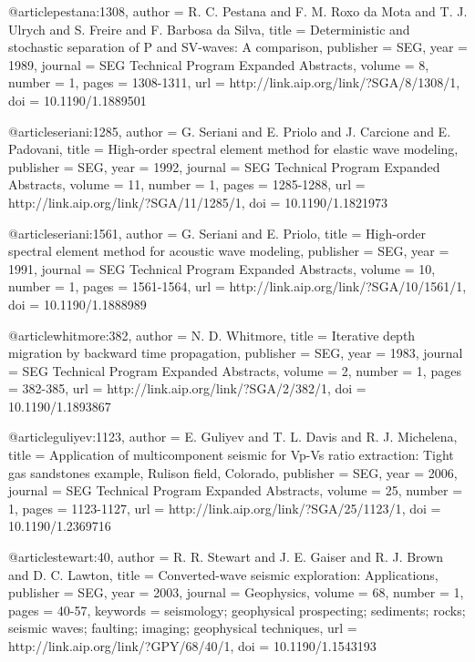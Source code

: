 {@article{pestana:1308,
  author =	 {R. C. Pestana and F. M. Roxo da Mota and
                  T. J. Ulrych and S. Freire and F. Barbosa
                  da Silva},
  title =	 {Deterministic and stochastic separation of {P} and
                  {SV}-waves: A comparison},
  publisher =	 {SEG},
  year =	 1989,
  journal =	 {SEG Technical Program Expanded Abstracts},
  volume =	 8,
  number =	 1,
  pages =	 {1308-1311},
  url =		 {http://link.aip.org/link/?SGA/8/1308/1},
  doi =		 {10.1190/1.1889501}
}

@article{seriani:1285,
  author =	 {G. Seriani and E. Priolo and J. Carcione and
                  E. Padovani},
  title =	 {High-order spectral element method for elastic wave
                  modeling},
  publisher =	 {SEG},
  year =	 1992,
  journal =	 {SEG Technical Program Expanded Abstracts},
  volume =	 11,
  number =	 1,
  pages =	 {1285-1288},
  url =		 {http://link.aip.org/link/?SGA/11/1285/1},
  doi =		 {10.1190/1.1821973}
}

@article{seriani:1561,
  author =	 {G. Seriani and E. Priolo},
  title =	 {High-order spectral element method for acoustic wave
                  modeling},
  publisher =	 {SEG},
  year =	 1991,
  journal =	 {SEG Technical Program Expanded Abstracts},
  volume =	 10,
  number =	 1,
  pages =	 {1561-1564},
  url =		 {http://link.aip.org/link/?SGA/10/1561/1},
  doi =		 {10.1190/1.1888989}
}

@article{whitmore:382,
  author =	 {N. D. Whitmore},
  title =	 {Iterative depth migration by backward time
                  propagation},
  publisher =	 {SEG},
  year =	 1983,
  journal =	 {SEG Technical Program Expanded Abstracts},
  volume =	 2,
  number =	 1,
  pages =	 {382-385},
  url =		 {http://link.aip.org/link/?SGA/2/382/1},
  doi =		 {10.1190/1.1893867}
}

@article{guliyev:1123,
  author =	 {E. Guliyev and T. L. Davis and R.
                  J. Michelena},
  title =	 {Application of multicomponent seismic for Vp-Vs
                  ratio extraction: Tight gas sandstones example,
                  Rulison field, Colorado},
  publisher =	 {SEG},
  year =	 2006,
  journal =	 {SEG Technical Program Expanded Abstracts},
  volume =	 25,
  number =	 1,
  pages =	 {1123-1127},
  url =		 {http://link.aip.org/link/?SGA/25/1123/1},
  doi =		 {10.1190/1.2369716}
}

@article{stewart:40,
  author =	 {R. R. Stewart and J. E. Gaiser and R. J.
                  Brown and D. C. Lawton},
  title =	 {Converted-wave seismic exploration: Applications},
  publisher =	 {SEG},
  year =	 2003,
  journal =	 {Geophysics},
  volume =	 68,
  number =	 1,
  pages =	 {40-57},
  keywords =	 {seismology; geophysical prospecting; sediments;
                  rocks; seismic waves; faulting; imaging; geophysical
                  techniques},
  url =		 {http://link.aip.org/link/?GPY/68/40/1},
  doi =		 {10.1190/1.1543193}
}

}
